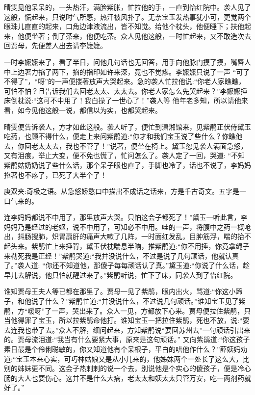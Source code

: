 \begin{parag}
    晴雯见他呆呆的，一头热汗，满脸紫胀，忙拉他的手，一直到怡红院中。袭人见了这般，慌起来，只说时气所感，热汗被风扑了。无奈宝玉发热事犹小可，更觉两个眼珠儿直直的起来，口角边津液流出，皆不知觉。给他个枕头，他便睡下；扶他起来，他便坐著；倒了茶来，他便吃茶。众人见他这般，一时忙起来，又不敢造次去回贾母，先便差人出去请李嬷嬷。
\end{parag}


\begin{parag}
    一时李嬷嬷来了，看了半日，问他几句话也无回答，用手向他脉门摸了摸，嘴唇人中上边著力掐了两下，掐的指印如许来深，竟也不觉疼。李嬷嬷只说了一声 “可了不得了”，“呀”的一声便搂著放声大哭起来。急的袭人忙拉他说:“你老人家瞧瞧，可怕不怕？且告诉我们去回老太太、太太去。你老人家怎么先哭起来？”李嬷嬷捶床倒枕说:“这可不中用了！我白操了一世心了！”袭人等 他年老多知，所以请他来看，如今见他这般一说，都信以为实，也都哭起来。
\end{parag}


\begin{parag}
    晴雯便告诉袭人，方才如此这般。袭人听了，便忙到潇湘馆来，见紫鹃正伏侍黛玉吃药，也顾不得什么，便走上来问紫鹃道:“你才和我们宝玉说了些什么？你瞧他去，你回老太太去，我也不管了！”说著，便坐在椅上。黛玉忽见袭人满面急怒，又有泪痕，举止大变，便不免也慌了，忙问怎么了。袭人定了一回，哭道: “不知紫鹃姑奶奶说了些什么话，那个呆子眼也直了，手脚也冷了，话也不说了，李妈妈掐著也不疼了，已死了大半个了！\begin{note}庚双夹:奇极之语。从急怒娇憨口中描出不成话之话来，方是千古奇文。五字是一口气来的。\end{note}连李妈妈都说不中用了，那里放声大哭。只怕这会子都死了！”黛玉一听此言，李妈妈乃是经过的老妪，说不中用了，可知必不中用。哇的一声，将腹中之药一概呛出，抖肠搜肺，炽胃扇肝的痛声大嗽了几阵，一时面红发乱，目肿筋浮，喘的抬不起头来。紫鹃忙上来捶背，黛玉伏枕喘息半晌，推紫鹃道:“你不用捶，你竟拿绳子来勒死我是正经！”紫鹃哭道:“我并没说什么，不过是说了几句顽话，他就认真了。”袭人道: “你还不知道他，那傻子每每顽话认了真。”黛玉道:“你说了什么话，趁早儿去解说，他只怕就醒过来了。”紫鹃听说，忙下了床，同袭人到了怡红院。
\end{parag}


\begin{parag}
    谁知贾母王夫人等已都在那里了。贾母一见了紫鹃，眼内出火，骂道:“你这小蹄子，和他说了什么？”紫鹃忙道:“并没说什么，不过说几句顽话。”谁知宝玉见了紫鹃，方“嗳呀”了一声，哭出来了。众人一见，方都放下心来。贾母便拉住紫鹃，只当他得罪了宝玉，所以拉紫鹃命他打。谁知宝玉一把拉住紫鹃，死也不放，说:“要去连我也带了去。”众人不解，细问起来，方知紫鹃说“要回苏州去”一句顽话引出来的。贾母流泪道:“我当有什么要紧大事，原来是这句顽话。” 又向紫鹃道:“你这孩子素日最是个伶俐聪敏的，你又知道他有个呆根子，平白的哄他作什么？”薛姨妈劝道:“宝玉本来心实，可巧林姑娘又是从小儿来的，他姊妹两个一处长了这么大，比别的姊妹更不同。这会子热剌剌的说一个去，别说他是个实心的傻孩子，便是冷心肠的大人也要伤心。这并不是什么大病，老太太和姨太太只管万安，吃一两剂药就好了。”
\end{parag}


